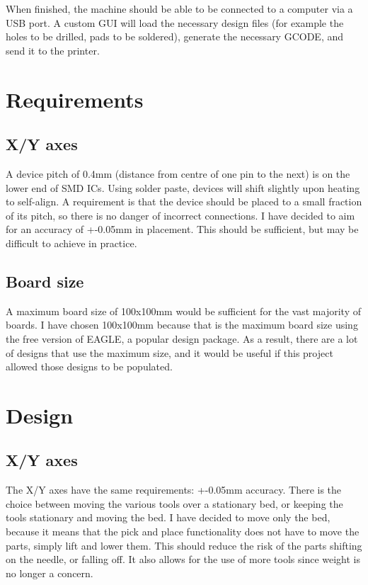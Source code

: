 \documentclass[a4paper,11pt]{article}  %
\begin{document}
\parskip 0.18in

When finished, the machine should be able to be connected to a computer via a USB port. A custom GUI will load the necessary 
design files (for example the holes to be drilled, pads to be soldered), generate the necessary GCODE, and send it to the printer.

\section{Requirements}

\subsection{X/Y axes}
A device pitch of 0.4mm (distance from centre of one pin to the next) is on the lower end of SMD ICs. Using solder paste,
devices will shift slightly upon heating to self-align. A requirement is that the device should be placed to a
small fraction of its pitch, so there is no danger of incorrect connections. I have decided to aim for an accuracy of +-0.05mm
in placement. This should be sufficient, but may be difficult to achieve in practice.

\subsection{Board size}
A maximum board size of 100x100mm would be sufficient for the vast majority of boards. I have chosen 100x100mm because that
is the maximum board size using the free version of EAGLE, a popular design package. As a result, there are a lot of designs
that use the maximum size, and it would be useful if this project allowed those designs to be populated.

\section{Design}

\subsection{X/Y axes}

The X/Y axes have the same requirements: +-0.05mm accuracy. There is the choice between moving the various tools over a stationary
bed, or keeping the tools stationary and moving the bed. I have decided to move only the bed, because it means that the pick
and place functionality does not have to move the parts, simply lift and lower them. This should reduce the risk of the parts
shifting on the needle, or falling off. It also allows for the use of more tools since weight is no longer a concern.
\end{document}
